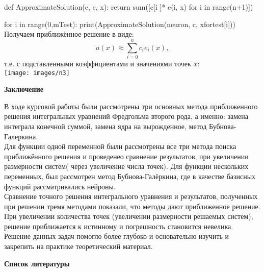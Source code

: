 \documentclass[12pt]{article}
\begin{document}
def ApproximateSolution(e, c, x): \vskip 0.3cm
return sum([c[i ]* e(i, x) for i in range(n+1)]) \vskip 0.3cm

for i in range(0,mTest):  \vskip 0.3cm
print(ApproximateSolution(neuron, c, xfortest[i])) \\

Получаем приближённое решение в виде: \\
$$u(x) \approx\sum_{i=0}^n c_i e_i(x),$$
\newpage
т.е. с подставленными коэффициентами и значениями точек $ x $:\\

\texttt{[image: images/n3]}  \\














\newpage
\begin{center}
	\textbf{Заключение}\\
\end{center}

В ходе курсовой работы были рассмотрены три основных метода приближенного решения интегральных уравнений Фредгольма второго рода, а именно: замена интеграла конечной суммой, замена ядра на вырожденное, метод Бубнова-Галеркина.\\

Для функции одной переменной были рассмотрены все три метода поиска приближённого решения и проведенео сравнение результатов, при увеличении размерности систем( через увеличение числа точек). Для функции нескольких переменных, был рассмотрен метод Бубнова-Галёркина, где в качестве базисных функций рассматривались нейроны.\\

Сравнение точного решения интегрального уравнения и результатов, полученных при решении тремя методами показали, что методы дают приближенное решение. При увеличении количества точек (увеличении размерности решаемых систем), решение приближается к истинному и погрешность становится невелика.  \\

Решение данных задач помогло более глубоко и основательно изучить и закрепить на практике теоретический материал.\\



\newpage
\begin{center}
	\textbf{Список литературы}\\
\end{center}
\end{document}

